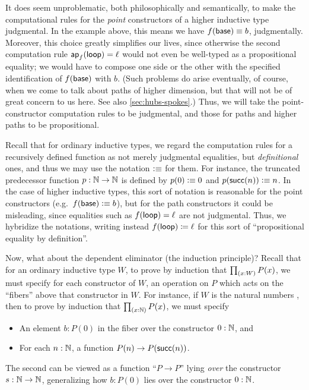 It does seem unproblematic, both philosophically and semantically, to make the computational rules for the \emph{point} constructors of a higher inductive type judgmental.
In the example above, this means we have $f(\mathsf{base})\equiv b$, judgmentally.
Moreover, this choice greatly simplifies our lives, since otherwise the second computation rule $\mathsf{ap}_{f} (\mathsf{loop}) = \ell$ would not even be well-typed as a propositional equality; we would have to compose one side or the other with the specified identification of $f(\mathsf{base})$ with $b$.
(Such problems do arise eventually, of course, when we come to talk about paths of higher dimension, but that will not be of great concern to us here.
See also \autoref{sec:hubs-spokes}.)
Thus, we will take the point-constructor computation rules to be judgmental, and those for paths and higher paths to be propositional.

\begin{rmk}
Recall that for ordinary inductive types, we regard the computation rules for a recursively defined function as not merely judgmental equalities, but \emph{definitional} ones, and thus we may use the notation $\vcentcolon\equiv$ for them.
For instance, the truncated predecessor function $p:\mathbb{N}\to\mathbb{N}$ is defined by $p(0)\vcentcolon\equiv 0$ and $p(\mathsf{succ}(n))\vcentcolon\equiv n$.
In the case of higher inductive types, this sort of notation is reasonable for the point constructors (e.g.\ $f(\mathsf{base})\vcentcolon\equiv b$), but for the path constructors it could be misleading, since equalities such as ${f}({\mathsf{loop}}) = \ell$ are not judgmental.
Thus, we hybridize the notations, writing instead ${f}({\mathsf{loop}}) \coloneqq \ell$ for this sort of ``propositional equality by definition''.
\end{rmk}

Now, what about the dependent eliminator (the induction principle)?
Recall that for an ordinary inductive type $W$, to prove by induction that $\prd{x:W} P(x)$, we must specify for each constructor of $W$, an operation on $P$ which acts on the ``fibers'' above that constructor in $W$.
For instance, if $W$ is the natural numbers \nat, then to prove by induction that $\prd{x:\nat} P(x)$, we must specify
\begin{itemize}
\item An element $b:P(0)$ in the fiber over the constructor $0:\mathbb{N}$, and
\item For each $n:\mathbb{N}$, a function $P(n) \to P(\mathsf{succ}(n))$.
\end{itemize}
The second can be viewed as a function ``$P\to P$'' lying \emph{over} the constructor $s:\mathbb{N}\to\mathbb{N}$, generalizing how $b:P(0)$ lies over the constructor $0:\mathbb{N}$.

